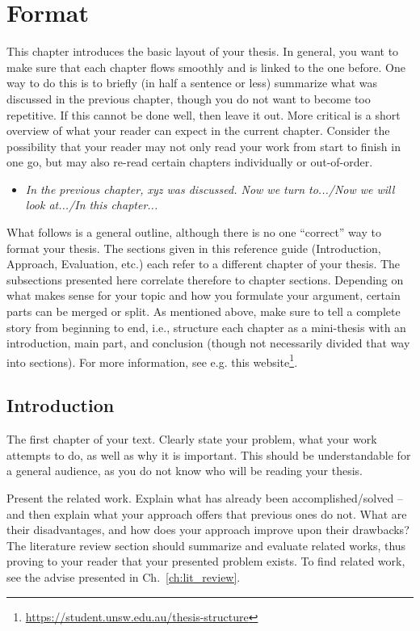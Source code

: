 \chapter{Format} \label{ch:format}
This chapter introduces the basic layout of your thesis. In general, you want to make sure that each chapter flows smoothly and is linked to the one before. One way to do this is to briefly (in half a sentence or less) summarize what was discussed in the previous chapter, though you do not want to become too repetitive. If this cannot be done well, then leave it out. More critical is a short overview of what your reader can expect in the current chapter. Consider the possibility that your reader may not only read your work from start to finish in one go, but may also re-read certain chapters individually or out-of-order. 

\begin{itemize}
	\item \textit{In the previous chapter, xyz was discussed. Now we turn to.../Now we will look at.../In this chapter...}
\end{itemize}

What follows is a general outline, although there is no one ``correct'' way to format your thesis. The sections given in this reference guide (Introduction, Approach, Evaluation, etc.) each refer to a different chapter of your thesis. The subsections presented here correlate therefore to chapter sections. Depending on what makes sense for your topic and how you formulate your argument, certain parts can be merged or split. As mentioned above, make sure to tell a complete story from beginning to end, i.e., structure each chapter as a mini-thesis with an introduction, main part, and conclusion (though not necessarily divided that way into sections). For more information, see e.g. this website\footnote{\url{https://student.unsw.edu.au/thesis-structure}}.


\section{Introduction} \label{sec:intro}
The first chapter of your text. Clearly state your problem, what your work attempts to do, as well as why it is important. This should be understandable for a general audience, as you do not know who will be reading your thesis. 

Present the related work. Explain what has already been accomplished/solved -- and then explain what your approach offers that previous ones do not. What are their disadvantages, and how does your approach improve upon their drawbacks? The literature review section should summarize and evaluate related works, thus proving to your reader that your presented problem exists. To find related work, see the advise presented in Ch.~\ref{ch:lit_review}.

